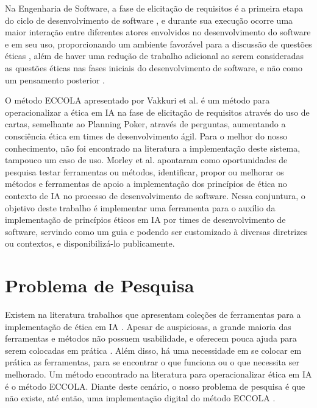 Na Engenharia de Software, a fase de elicitação de requisitos é a primeira etapa do ciclo de desenvolvimento de software \cite{Sommerville07}, e durante sua execução ocorre uma maior interação entre diferentes atores envolvidos no desenvolvimento do software e em seu uso, proporcionando um ambiente favorável para a discussão de questões éticas \cite{Kostova2020}, além de haver uma redução de trabalho adicional ao serem consideradas as questões éticas nas fases iniciais do desenvolvimento de software, e não como um pensamento posterior \cite{ECCOLA}.

O método ECCOLA apresentado por Vakkuri et al. \cite{ECCOLA} é um método para operacionalizar a ética em IA na fase de elicitação de requisitos através do uso de cartas, semelhante ao Planning Poker, através de perguntas, aumentando a consciência ética em times de desenvolvimento ágil. Para o melhor do nosso conhecimento, não foi encontrado na literatura a implementação deste sistema, tampouco um caso de uso. Morley et al. \cite{morley2019initial} apontaram como oportunidades de pesquisa testar ferramentas ou métodos, identificar, propor ou melhorar os métodos e ferramentas de apoio a implementação dos princípios de ética no contexto de IA no processo de desenvolvimento de software. Nessa conjuntura, o objetivo deste trabalho é implementar uma ferramenta para o auxílio da implementação de princípios éticos em IA por times de desenvolvimento de software, servindo como um guia e podendo ser customizado à diversas diretrizes ou contextos, e disponibilizá-lo publicamente.

\section{Problema de Pesquisa}
\label{problem}

Existem na literatura trabalhos que apresentam coleções de ferramentas para a implementação de ética em IA \cite{morley2019initial,siqueira2021ethical}. Apesar de auspiciosas, a grande maioria das ferramentas e métodos não possuem usabilidade, e oferecem pouca ajuda para serem colocadas em prática \cite{vakkuri2020current,morley2021EthicsAsAService,morley2019initial}. Além disso, há uma necessidade em se colocar em prática as ferramentas, para se encontrar o que funciona ou o que necessita ser melhorado. Um método encontrado na literatura para operacionalizar ética em IA é o método ECCOLA\cite{ECCOLA}. Diante deste cenário, o nosso problema de pesquisa é que não existe, até então, uma implementação digital do método ECCOLA \cite{ECCOLA}.

